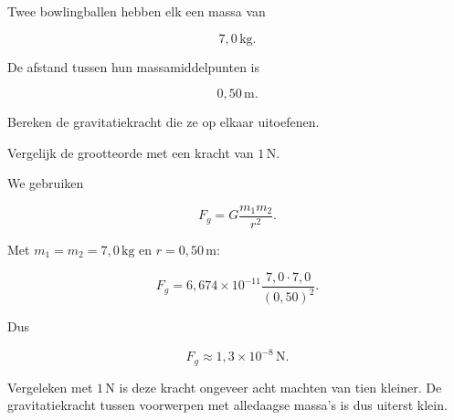 \documentclass{ximera}
\begin{document}
\begin{oefening}{\oefB}

Twee bowlingballen hebben elk een massa van

\[
7{,}0\,\mathrm{kg}.
\]

De afstand tussen hun massamiddelpunten is

\[
0{,}50\,\mathrm m.
\]

Bereken de gravitatiekracht die ze op elkaar uitoefenen.

Vergelijk de grootteorde met een kracht van $1\,\mathrm N$.


\begin{oplossing}

We gebruiken

\[
F_g=G\frac{m_1m_2}{r^2}.
\]

Met $m_1=m_2=7{,}0\,\mathrm{kg}$ en $r=0{,}50\,\mathrm m$:

\[
F_g
=
6{,}674\times10^{-11}
\frac{7{,}0\cdot7{,}0}{(0{,}50)^2}.
\]

Dus

\[
\boxed{
F_g\approx1{,}3\times10^{-8}\,\mathrm N.
}
\]

Vergeleken met $1\,\mathrm N$ is deze kracht ongeveer acht machten van
tien kleiner. De gravitatiekracht tussen voorwerpen met alledaagse
massa's is dus uiterst klein.

\end{oplossing}

\end{oefening}
\end{document}
